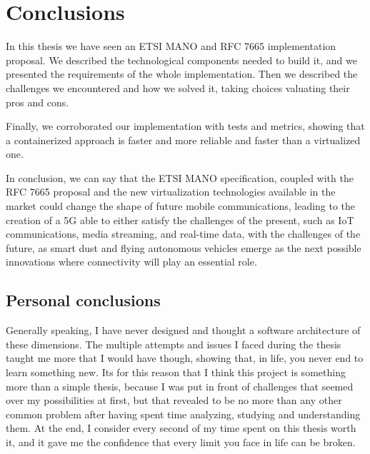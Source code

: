 \chapter{Conclusions}
\label{chap:conclusions}

In this thesis we have seen an ETSI MANO and RFC 7665 implementation proposal. 
We described the technological components needed to build it, and we presented 
the requirements of the whole implementation. Then we described the challenges 
we encountered and how we solved it, taking choices valuating their pros and 
cons.

Finally, we corroborated our implementation with tests and metrics, showing 
that a containerized approach is faster and more reliable and faster than a 
virtualized one.

In conclusion, we can say that the ETSI MANO specification, coupled with the 
RFC 7665 proposal and the new virtualization technologies available in the 
market could change the shape of future mobile communications, leading to the 
creation of a 5G able to either satisfy the challenges of the present, such as 
IoT communications, media streaming, and real-time data, with the challenges of 
the future, as smart dust and flying autonomous vehicles emerge as the next 
possible innovations where connectivity will play an essential role.

\section*{Personal conclusions}

Generally speaking, I have never designed and thought a software architecture of
these dimensions. The multiple attempts and issues I faced during the thesis
taught me more that I would have though, showing that, in life, you never end to
learn something new. Its for this reason that I think this project is something
more than a simple thesis, because I was put in front of challenges that seemed
over my possibilities at first, but that revealed to be no more than any other
common problem after having spent time analyzing, studying and understanding
them. At the end, I consider every second of my time spent on this thesis worth
it, and it gave me the confidence that every limit you face in life can be
broken.
